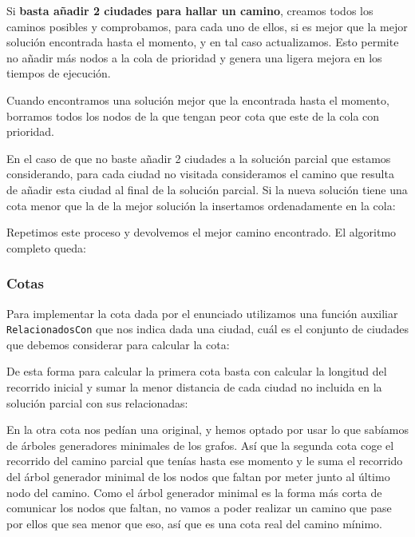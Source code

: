 Si \textbf{basta añadir 2 ciudades para hallar un camino}, creamos todos los caminos posibles y comprobamos, para cada uno de ellos, si es mejor que la mejor solución encontrada hasta el momento, y en tal caso actualizamos. Esto permite no añadir más nodos a la cola de prioridad y genera una ligera mejora en los tiempos de ejecución.


Cuando encontramos una solución mejor que la encontrada hasta el momento, borramos todos los nodos de la que tengan peor cota que este de la cola con prioridad.

En el caso de que no baste añadir 2 ciudades a la solución parcial que estamos considerando, para cada ciudad no visitada consideramos el camino que resulta de añadir esta ciudad al final de la solución parcial. Si la nueva solución tiene una cota menor que la de la mejor solución la insertamos ordenadamente en la cola:


Repetimos este proceso y devolvemos el mejor camino encontrado. El algoritmo completo queda:


\subsubsection{Cotas}

Para implementar la cota dada por el enunciado utilizamos una función auxiliar \texttt{RelacionadosCon} que nos indica dada una ciudad, cuál es el conjunto de ciudades que debemos considerar para calcular la cota:



De esta forma para calcular la primera cota basta con calcular la longitud del recorrido inicial y sumar la menor distancia de cada ciudad no incluida en la solución parcial con sus relacionadas:



En la otra cota nos pedían una original, y hemos optado por usar lo que sabíamos de árboles generadores minimales de los grafos. Así que la segunda cota coge el recorrido del camino parcial que tenías hasta ese momento y le suma el recorrido del árbol generador minimal de los nodos que faltan por meter junto al último nodo del camino. Como el árbol generador minimal es la forma más corta de comunicar los nodos que faltan, no vamos a poder realizar un camino que pase por ellos que sea menor que eso, así que es una cota real del camino mínimo.

